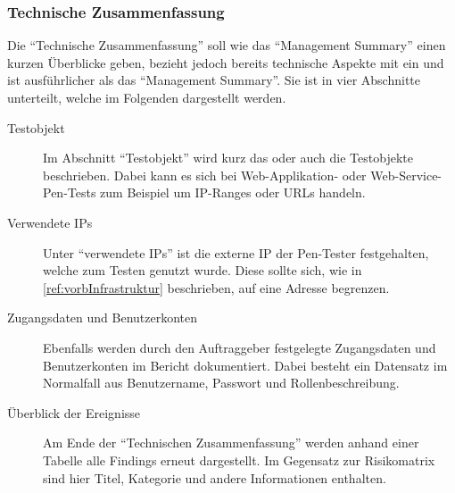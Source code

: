	\newpage
	\subsubsection{Technische Zusammenfassung}\label{ref:penBerTechZum}
	Die "`Technische Zusammenfassung"' soll wie das "`Management Summary"' einen kurzen Überblicke geben, bezieht jedoch bereits technische Aspekte mit ein und ist ausführlicher als das "`Management Summary"'. Sie ist in vier Abschnitte unterteilt, welche im Folgenden dargestellt werden.
	
	\begin{description}
		\item[Testobjekt] Im Abschnitt	"`Testobjekt"' wird kurz das oder auch die Testobjekte beschrieben. Dabei kann es sich bei Web-Applikation- oder Web-Service-Pen-Tests zum Beispiel um IP-Ranges oder URLs handeln.
		
		\item[Verwendete IPs] Unter "`verwendete IPs"' ist die externe IP der Pen-Tester festgehalten, welche zum Testen genutzt wurde. Diese sollte sich, wie in \ref{ref:vorbInfrastruktur} beschrieben, auf eine Adresse begrenzen.
		
		\item[Zugangsdaten und Benutzerkonten] Ebenfalls werden durch den Auftraggeber festgelegte Zugangsdaten und Benutzerkonten im Bericht dokumentiert. Dabei besteht ein Datensatz im Normalfall aus Benutzername, Passwort und Rollenbeschreibung.
		
		\item[Überblick der Ereignisse] Am Ende der "`Technischen Zusammenfassung"' werden anhand einer Tabelle alle Findings erneut dargestellt. Im Gegensatz zur Risikomatrix sind hier Titel, Kategorie und andere Informationen enthalten.
	\end{description}
		
